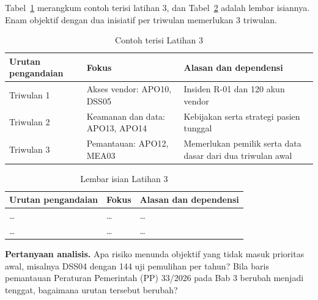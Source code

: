 Tabel~\ref{tab:ch04-lat3-contoh} merangkum contoh terisi latihan 3, dan Tabel~\ref{tab:ch04-lat3-hasil} adalah lembar isiannya. Enam objektif dengan dua inisiatif per triwulan memerlukan 3 triwulan.

\begin{table}[!htb]
  \centering\small
  \caption{Contoh terisi Latihan 3}\label{tab:ch04-lat3-contoh}
  \begin{tabularx}{\textwidth}{|>{\raggedright\arraybackslash}p{}|>{\raggedright\arraybackslash}p{}|>{\raggedright\arraybackslash}X|}
    \hline
    \textbf{Urutan pengandaian} & \textbf{Fokus} & \textbf{Alasan dan dependensi} \\ \hline
    Triwulan 1 & Akses vendor: APO10, DSS05 & Insiden R-01 dan 120 akun vendor \\ \hline
    Triwulan 2 & Keamanan dan data: APO13, APO14 & Kebijakan serta strategi pasien tunggal \\ \hline
    Triwulan 3 & Pemantauan: APO12, MEA03 & Memerlukan pemilik serta data dasar dari dua triwulan awal \\ \hline
  \end{tabularx}
\end{table}

\begin{table}[!htb]
  \centering\small
  \caption{Lembar isian Latihan 3}\label{tab:ch04-lat3-hasil}
  \begin{tabularx}{\textwidth}{|>{\raggedright\arraybackslash}p{}|>{\raggedright\arraybackslash}p{}|>{\raggedright\arraybackslash}X|}
    \hline
    \textbf{Urutan pengandaian} & \textbf{Fokus} & \textbf{Alasan dan dependensi} \\ \hline
    \dots & \dots & \dots \\ \hline
    \dots & \dots & \dots \\ \hline
  \end{tabularx}
\end{table}

\textbf{Pertanyaan analisis.} Apa risiko menunda objektif yang tidak masuk prioritas awal, misalnya DSS04 dengan 144 uji pemulihan per tahun? Bila baris pemantauan Peraturan Pemerintah (PP) 33/2026 pada Bab 3 berubah menjadi tenggat, bagaimana urutan tersebut berubah?

